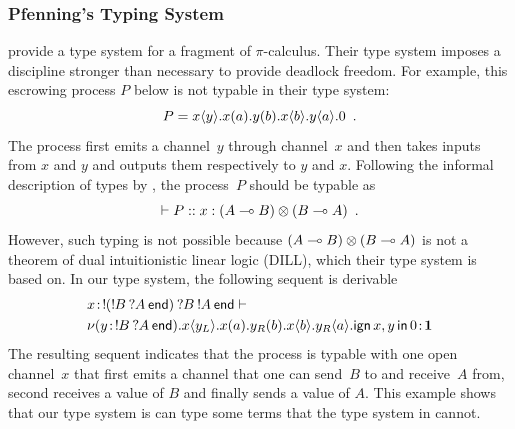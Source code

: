 \subsubsection{Pfenning's Typing System}
\label{pfenning}

\citet{pfenning2010} provide a type system for a fragment of $\pi$-calculus.
Their type system imposes a discipline stronger
than necessary to provide deadlock freedom.
For example, this escrowing process $P$ below is not typable in their type
system:
\[
 P = {x}\langle{y}\rangle.{{{x}({a}).{{{y}({b}).{{x}\langle{b}\rangle.{{y}\langle{a}\rangle.{0}}}}}}}\enspace.
\]
The process first emits a channel~$y$ through channel~$x$ and then
takes inputs from $x$ and $y$ and outputs them respectively to $y$ and $x$.
Following the informal description of types by \citet{pfenning2010},
the process~$P$ should be typable as
\[
 \vdash P::x:(A\multimap B)\otimes(B\multimap A)\enspace.
\]
However, such typing is not possible because $(A\multimap B)\otimes (B\multimap
A)$ is not a theorem of dual intuitionistic linear logic (DILL), which
their type system
is based on.
In our type system, the following sequent is derivable
\begin{align*}
&
{x} \mathord{\colon\kern -2pt}{\mathop{!}\kern -2pt{(\mathop{!}\kern -2pt{B}\hskip 2pt{\mathop{?}\kern -2pt{A}\hskip 2pt{\mathsf{end}}})}\hskip 2pt{\mathop{?}\kern -2pt{B}\hskip 2pt{\mathop{!}\kern -2pt{A}\hskip 2pt{\mathsf{end}}}}}
\vdash\\
&{
\nu({y} \mathord{\colon\kern -2pt}{\mathop{!}\kern -2pt{B}\hskip 2pt{\mathop{?}\kern -2pt{A}\hskip 2pt{\mathsf{end}}}}).
{{x}\langle{y_L}\rangle.{{{x}({a}).{{{y_R}({b}).{{x}\langle{b}\rangle.{{y_R}\langle{a}\rangle.{\mathsf{ign }\,{x,y}\,\mathsf{ in }\,{0}}}}}}}}}
} \mathord{\colon\kern -2pt}{\mathbf{1}}
\end{align*}
The resulting sequent indicates that the process is typable with one
open channel~$x$ that first emits
a channel that one can send~$B$ to and receive~$A$ from, second receives a
value of $B$ and
finally sends a value of $A$.
This example shows that our type system is can type some terms that
the type system in \citet{pfenning2010} cannot.

